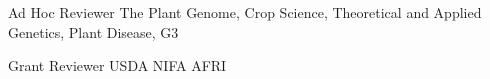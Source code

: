 
\begin{cvskills}

  \cvskill
    {Ad Hoc Reviewer} %
    {The Plant Genome, Crop Science, Theoretical and Applied Genetics, Plant Disease, G3}
    
  \cvskill
    {Grant Reviewer} %
    {USDA NIFA AFRI}

\end{cvskills}
